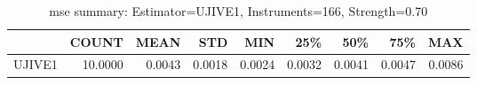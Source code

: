 \begin{table}[ht]
\centering
\caption{mse summary: Estimator=UJIVE1, Instruments=166, Strength=0.70}
\begin{tabular}{lrrrrrrrr}
\toprule
 & COUNT & MEAN & STD & MIN & 25\% & 50\% & 75\% & MAX \\
\midrule
UJIVE1 & 10.0000 & 0.0043 & 0.0018 & 0.0024 & 0.0032 & 0.0041 & 0.0047 & 0.0086 \\
\bottomrule
\end{tabular}
\end{table}

